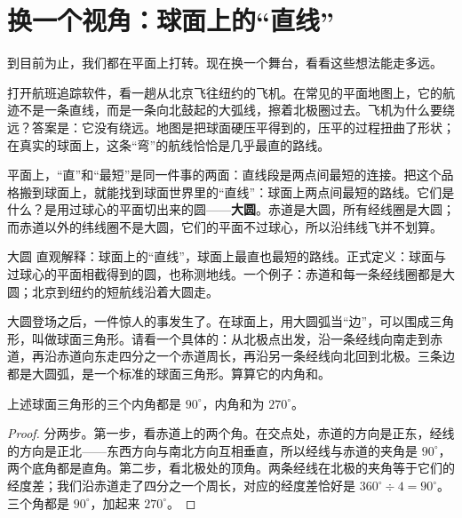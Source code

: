 \section{换一个视角：球面上的``直线''}

到目前为止，我们都在平面上打转。现在换一个舞台，看看这些想法能走多远。

打开航班追踪软件，看一趟从北京飞往纽约的飞机。在常见的平面地图上，它的航迹不是一条直线，而是一条向北鼓起的大弧线，擦着北极圈过去。飞机为什么要绕远？答案是：它没有绕远。地图是把球面硬压平得到的，压平的过程扭曲了形状；在真实的球面上，这条``弯''的航线恰恰是几乎最直的路线。

平面上，``直''和``最短''是同一件事的两面：直线段是两点间最短的连接。把这个品格搬到球面上，就能找到球面世界里的``直线''：球面上两点间最短的路线。它们是什么？是用过球心的平面切出来的圆——\textbf{大圆}。赤道是大圆，所有经线圈是大圆；而赤道以外的纬线圈不是大圆，它们的平面不过球心，所以沿纬线飞并不划算。

\begin{shuyu}{大圆}
直观解释：球面上的``直线''，球面上最直也最短的路线。正式定义：球面与过球心的平面相截得到的圆，也称测地线。一个例子：赤道和每一条经线圈都是大圆；北京到纽约的短航线沿着大圆走。
\end{shuyu}

大圆登场之后，一件惊人的事发生了。在球面上，用大圆弧当``边''，可以围成三角形，叫做球面三角形。请看一个具体的：从北极点出发，沿一条经线向南走到赤道，再沿赤道向东走四分之一个赤道周长，再沿另一条经线向北回到北极。三条边都是大圆弧，是一个标准的球面三角形。算算它的内角和。

\begin{dingli}[有三个直角的三角形]
上述球面三角形的三个内角都是 $90^\circ$，内角和为 $270^\circ$。
\end{dingli}

\begin{proof}
分两步。第一步，看赤道上的两个角。在交点处，赤道的方向是正东，经线的方向是正北——东西方向与南北方向互相垂直，所以经线与赤道的夹角是 $90^\circ$，两个底角都是直角。第二步，看北极处的顶角。两条经线在北极的夹角等于它们的经度差；我们沿赤道走了四分之一个周长，对应的经度差恰好是 $360^\circ \div 4 = 90^\circ$。三个角都是 $90^\circ$，加起来 $270^\circ$。
\end{proof}

\begin{center}
\end{center}

